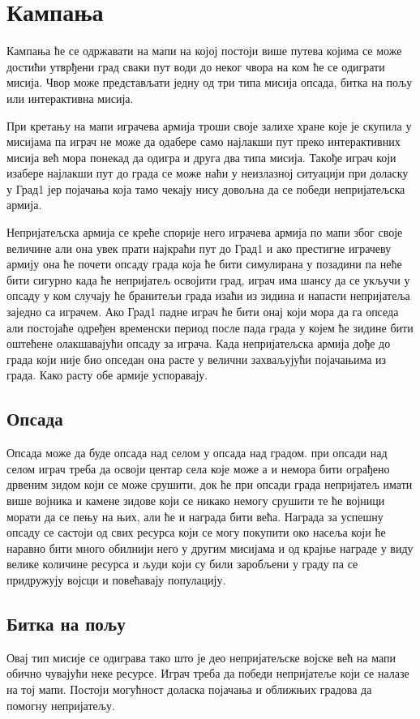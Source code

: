 \documentclass[11pt,a4paper]{report}
\begin{document}
\section{Кампања}
Кампања ће се одржавати на мапи на којој постоји више путева којима се може достићи утврђени град сваки пут води до неког чвора на ком ће се одиграти мисија. Чвор може представљати једну од три типа мисија опсада, битка на пољу или интерактивна мисија.

При кретању на мапи играчева армија троши своје залихе хране које је скупила у мисијама па играч не може да одабере само најлакши пут преко интерактивних мисија већ мора понекад да одигра и друга два типа мисија. Такође играч који изабере најлакши пут до града се може наћи у неизлазној ситуацији при доласку у Град1 јер појачања која тамо чекају нису довољна да се победи непријатељска армија.

Непријатељска армија се креће спорије него играчева армија по мапи због своје величине али она увек прати најкраћи пут до Град1 и ако престигне играчеву армију она ће почети опсаду града која ће бити симулирана у позадини па неће бити сигурно када ће непријатељ освојити град, играч има шансу да се укључи у опсаду у ком случају ће бранитељи града изаћи из зидина и напасти непријатеља заједно са играчем. Ако Град1 падне играч ће бити онај који мора да га опседа али постојаће одређен временски период после пада града у којем ће зидине бити оштећене олакшавајући опсаду за играча. Када непријатељска армија дође до града који није био опседан она расте у велични захваљујући појачањима из града. Како расту обе армије успоравају.
\subsection{Опсада}
Опсада може да буде опсада над селом у опсада над градом. при опсади над селом играч треба да освоји центар села које може а и немора бити ограђено дрвеним зидом који се може срушити, док ће при опсади града непријатељ имати више војника и камене зидове који се никако немогу срушити те ће војници морати да се пењу на њих, али ће и  награда бити већа. Награда за успешну опсаду се састоји од свих ресурса који се могу покупити око насеља  који ће наравно бити много обилнији него у другим мисијама и од крајње награде у виду велике количине ресурса и људи који су били заробљени у граду па се придружују војсци и повећавају популацију.
\subsection{Битка на пољу}
Овај тип мисије се одиграва тако што је део непријатељске војске већ на мапи обично чувајући неке ресурсе. Играч треба да победи непријатеље који се налазе на тој мапи. Постоји могућност доласка појачања и оближњих градова да помогну непријатељу.
\end{document}
